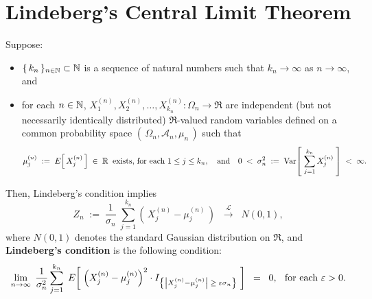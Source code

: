 

\section{Lindeberg's Central Limit Theorem}
\setcounter{theorem}{0}
\setcounter{equation}{0}

\renewcommand{\theenumi}{\alph{enumi}}
\renewcommand{\labelenumi}{\textnormal{(\theenumi)}$\;\;$}

\begin{theorem}
\mbox{}\vskip 0.2cm
\noindent
Suppose:
\begin{itemize}
\item	$\{\,k_{n}\,\}_{n\in\mathbb{N}}\subset\mathbb{N}$ is a sequence of natural numbers such that $k_{n} \rightarrow \infty$ as $n \rightarrow \infty$, and
\item	for each $n \in \mathbb{N}$, $X^{(n)}_{1}, X^{(n)}_{2}, \ldots, X^{(n)}_{k_{n}} : \Omega_{n} \longrightarrow \Re$
		are {\color{red}independent} (but not necessarily identically distributed)
		$\Re$-valued random variables defined on a common probability space
		$\left(\,\Omega_{n},\mathcal{A}_{n},\mu_{n}\,\right)$ such that
		\begin{equation*}
		\mu^{(n)}_{j} \;:=\; E\!\left[\,X^{(n)}_{j}\,\right] \;\in\; \mathbb{R} \;\;\textnormal{exists, for each $1 \leq j \leq k_{n}$},
		\quad\textnormal{and}\quad
		0 \;<\; \sigma^{2}_{n} \;:=\; \textnormal{Var}\!\left[\;\overset{k_{n}}{\underset{j=1}{\sum}}\,X^{(n)}_{j}\;\right] \;<\; \infty.
		\end{equation*}
\end{itemize}
Then, Lindeberg's condition implies
\begin{equation*}
Z_{n} \; := \;
\dfrac{1}{\sigma_{n}}\;\sum^{k_{n}}_{j=1}\left(\,X^{(n)}_{j} - \mu^{(n)}_{j}\,\right)
\;\;\overset{\mathcal{L}}{\longrightarrow}\;\;
N(0,1),
\end{equation*}
where $N(0,1)$ denotes the standard Gaussian distribution on $\Re$,
and \textbf{Lindeberg's condition} is the following condition:
\begin{equation*}
\lim_{n\rightarrow\infty}\;
\dfrac{1}{\sigma^{2}_{n}}
\sum_{j=1}^{k_{n}}\;
E\!\left[\;
\left(X^{(n)}_{j} - \mu^{(n)}_{j}\right)^{2}
\cdot
I_{\left\{\left\vert X^{(n)}_{j} - \mu^{(n)}_{j}\right\vert \;\geq\; \varepsilon \sigma_{n}\right\}}
\;\right]
\;\;=\;\;
0,
\;\;\,
\textnormal{for each $\varepsilon > 0$}.
\end{equation*}
\end{theorem}

